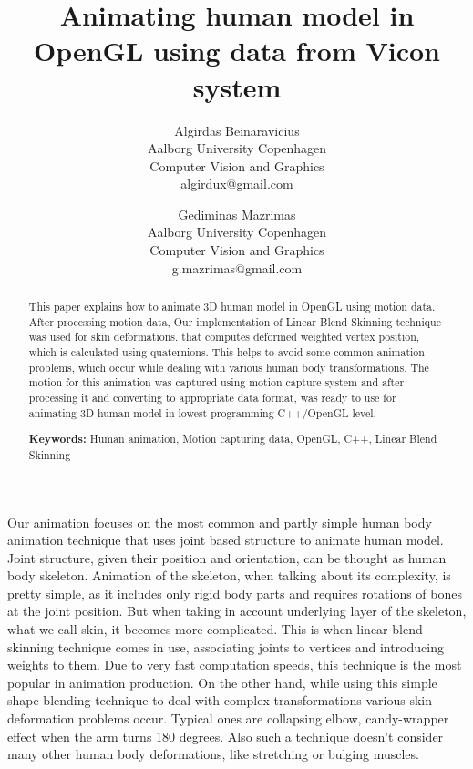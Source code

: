 \documentclass[times, 10pt,twocolumn]{article}
\begin{document}
\title{Animating human model in OpenGL using data from Vicon system}

\author{Algirdas Beinaravicius\\
Aalborg University Copenhagen\\ Computer Vision and Graphics\\algirdux@gmail.com
\and
Gediminas Mazrimas\\
Aalborg University Copenhagen\\ Computer Vision and Graphics\\g.mazrimas@gmail.com
}

\maketitle
\thispagestyle{empty}

\begin{abstract}
   This paper explains how to animate 3D human model in OpenGL 
   using motion data. After processing motion data,  Our implementation of Linear Blend Skinning technique was used for skin deformations.
   that computes deformed weighted vertex position, which is calculated using quaternions.
   This helps to avoid some common animation problems, which occur while dealing with
   various human body transformations.
   The motion for this animation was captured using motion capture system
   and after processing it and converting to appropriate data format, was ready to use for
   animating 3D human model in lowest programming C++/OpenGL level.

   \textbf{Keywords:} Human animation, Motion capturing data, OpenGL, C++, Linear Blend Skinning
\end{abstract}




Our animation focuses on the most common and partly simple human
body animation technique that uses joint based structure to animate human model. Joint structure,
given their position and orientation, can be thought as human body skeleton.
Animation of the skeleton, when talking about its complexity, is pretty simple,
as it includes only rigid body parts and requires rotations of bones at the joint position.
But when taking in account underlying layer of the skeleton, what we call skin, it becomes more
complicated. This is when linear blend skinning technique comes in use, associating joints to vertices and introducing weights to them. Due to very fast computation speeds, this technique is the most popular
in animation production. On the other hand, while using this simple shape blending technique
to deal with complex transformations various skin deformation problems occur. Typical ones are collapsing elbow, candy-wrapper effect when the arm turns 180 degrees.
Also such a technique doesn't consider many other human body deformations, like stretching or bulging muscles.
\end{document}
